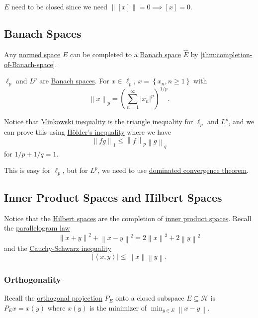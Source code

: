 \begin{remark}
	\(E\) need to be closed since we need \(\left\lVert [x]\right\rVert = 0 \implies [x] = 0\).
\end{remark}

\subsection{Banach Spaces}
Any \hyperref[def:normed-vector-space]{normed space} \(E\) can be completed to a \hyperref[def:Banach-space]{Banach space} \(\hat{E} \) by \autoref{thm:completion-of-Banach-space}.

\begin{eg}
	\(\ell _p\) and \(L^p\) are \hyperref[def:Banach-space]{Banach spaces}. For \(x\in \ell _p\), \(x= \left\{ x_n, n\geq 1 \right\} \) with
	\[
		\left\lVert x\right\rVert _p = \left( \sum_{n=1} ^{\infty} \left\vert x_n \right\vert ^p \right) ^{1 / p}.
	\]
\end{eg}

Notice that \hyperref[lma:Minkowski-ineq]{Minkowski inequality} is the triangle inequality for \(\ell _p\) and \(L^p\), and we can prove this using \hyperref[lma:Holder-ineq]{Hölder's inequality} where we have
\[
	\left\lVert fg\right\rVert _1 \leq \left\lVert f\right\rVert _p \left\lVert g\right\rVert _q
\]
for \(1 / p + 1 / q = 1\).

\begin{remark}
	This is easy for \(\ell _p\), but for \(L^p\), we need to use \href{https://en.wikipedia.org/wiki/Dominated_convergence_theorem}{dominated convergence theorem}.
\end{remark}

\subsection{Inner Product Spaces and Hilbert Spaces}
Notice that the \hyperref[def:Hilbert-space]{Hilbert spaces} are the completion of \hyperref[def:inner-product-space]{inner product spaces}. Recall the \hyperref[lma:parallelogram-law]{parallelogram law}
\[
	\left\lVert x + y\right\rVert ^{2} + \left\lVert x - y\right\rVert ^{2} = 2\left\lVert x\right\rVert ^{2} + 2 \left\lVert y\right\rVert ^{2}
\]
and the \hyperref[thm:Cauchy-Schwarz-ineq]{Cauchy-Schwarz inequality}
\[
	\left\vert \left\langle x, y \right\rangle  \right\vert \leq \left\lVert x\right\rVert \left\lVert y\right\rVert.
\]

\subsubsection{Orthogonality}
Recall the \hyperref[def:orthogonal-projection]{orthogonal projection} \(P_E\) onto a closed subspace \(E \subseteq \mathcal{H} \) is \(P_E x = x(y)\) where \(x(y)\) is the minimizer of \(\min _{y\in E} \left\lVert x - y\right\rVert \).

